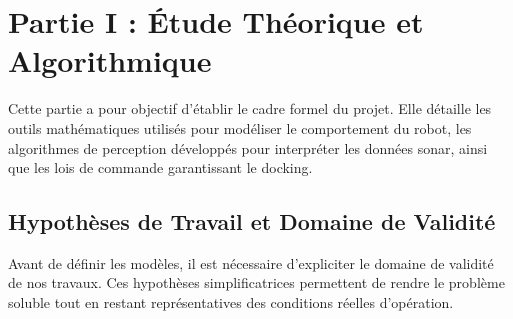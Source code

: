 \newpage
\chapter{Partie I : Étude Théorique et Algorithmique}

Cette partie a pour objectif d'établir le cadre formel du projet. Elle détaille les outils mathématiques utilisés pour modéliser le comportement du robot, les algorithmes de perception développés pour interpréter les données sonar, ainsi que les lois de commande garantissant le docking.

\section{Hypothèses de Travail et Domaine de Validité}

Avant de définir les modèles, il est nécessaire d'expliciter le domaine de validité de nos travaux. Ces hypothèses simplificatrices permettent de rendre le problème soluble tout en restant représentatives des conditions réelles d'opération.

